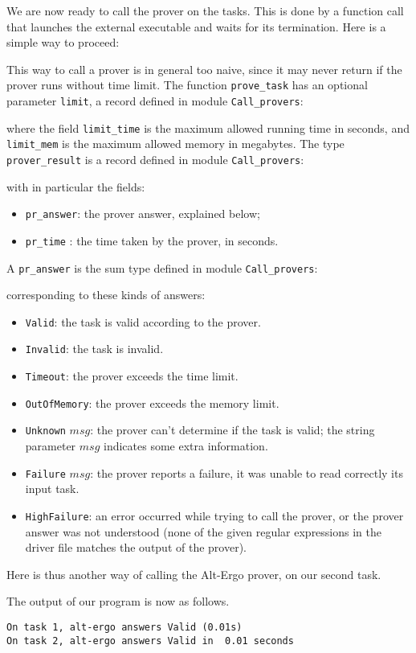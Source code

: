 We are now ready to call the prover on the tasks. This is done by a
function call that launches the external executable and waits for its
termination. Here is a simple way to proceed:

This way to call a prover is in general too naive, since it may never
return if the prover runs without time limit. The function
\texttt{prove\_task} has an optional parameter \texttt{limit}, a record defined
in module \texttt{Call\_provers}:

where the field \texttt{limit\_time} is the maximum allowed running time in seconds,
and \texttt{limit\_mem} is the maximum allowed memory in megabytes.  The type
\texttt{prover\_result} is a record defined in module \texttt{Call\_provers}:

with in particular the fields:
\begin{itemize}
\item \texttt{pr\_answer}: the prover answer, explained below;
\item \texttt{pr\_time} : the time taken by the prover, in seconds.
\end{itemize}
A \texttt{pr\_answer} is the sum type defined in module \texttt{Call\_provers}:

corresponding to these kinds of answers:
\begin{itemize}
\item \texttt{Valid}: the task is valid according to the prover.
\item \texttt{Invalid}: the task is invalid.
\item \texttt{Timeout}: the prover exceeds the time limit.
\item \texttt{OutOfMemory}: the prover exceeds the memory limit.
\item \texttt{Unknown} $msg$: the prover can't determine if the task
  is valid; the string parameter $msg$ indicates some extra
  information.
\item \texttt{Failure} $msg$: the prover reports a failure, \eg it
  was unable to read correctly its input task.
\item \texttt{HighFailure}: an error occurred while trying to call the
  prover, or the prover answer was not understood (\eg none of the
  given regular expressions in the driver file matches the output
  of the prover).
\end{itemize}
Here is thus another way of calling the Alt-Ergo prover, on our second
task.

The output of our program is now as follows.
\begin{verbatim}
On task 1, alt-ergo answers Valid (0.01s)
On task 2, alt-ergo answers Valid in  0.01 seconds
\end{verbatim}

